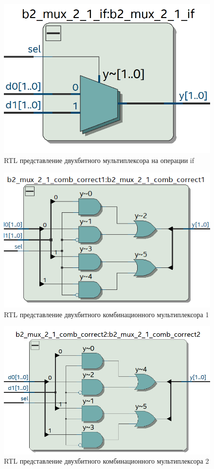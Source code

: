 \documentclass[a4paper,14pt]{article}
\begin{document}

\begin{figure}[H]
	\centering
	\includegraphics[width=0.6\linewidth]{img/z2_rtl_if}
	\caption{RTL представление двухбитного
		мультиплексора на операции if}
	\label{fig:z2_rtl_if}
\end{figure}



\begin{figure}[H]
	\centering
	\includegraphics[width=0.6\linewidth]{img/z2_rtl_cor1}
	\caption{RTL представление двухбитного комбинационного мультиплексора 1}
	\label{fig:z2_rtl_cor1}
\end{figure}
	


\begin{figure}[H]
	\centering
	\includegraphics[width=0.6\linewidth]{img/z2_rtl_cor2}
	\caption{RTL представление двухбитного комбинационного мультиплексора 2}
	\label{fig:z2_rtl_cor2}
\end{figure}
\end{document}
